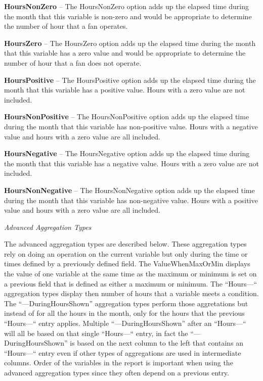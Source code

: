 \textbf{HoursNonZero} -- The HoursNonZero option adds up the elapsed time during the month that this variable is non-zero and would be appropriate to determine the number of hour that a fan operates.

\textbf{HoursZero} -- The HoursZero option adds up the elapsed time during the month that this variable has a zero value and would be appropriate to determine the number of hour that a fan does not operate.

\textbf{HoursPositive} -- The HoursPositive option adds up the elapsed time during the month that this variable has a positive value. Hours with a zero value are not included.

\textbf{HoursNonPositive} -- The HoursNonPositive option adds up the elapsed time during the month that this variable has non-positive value. Hours with a negative value and hours with a zero value are all included.

\textbf{HoursNegative} -- The HoursNegative option adds up the elapsed time during the month that this variable has a negative value. Hours with a zero value are not included.

\textbf{HoursNonNegative} -- The HoursNonNegative option adds up the elapsed time during the month that this variable has non-negative value. Hours with a positive value and hours with a zero value are all included.

\emph{Advanced Aggregation Types}

The advanced aggregation types are described below. These aggregation types rely on doing an operation on the current variable but only during the time or times defined by a previously defined field. The ValueWhenMaxOrMin displays the value of one variable at the same time as the maximum or minimum is set on a previous field that is defined as either a maximum or minimum. The ``Hours---`` aggregation types display then number of hours that a variable meets a condition. The ``---DuringHoursShown'' aggregation types perform those aggretations but instead of for all the hours in the month, only for the hours that the previous ``Hours---`` entry applies. Multiple ``---DuringHoursShown'' after an ``Hours---`` will all be based on that single ``Hours---`` entry, in fact the ``---DuringHoursShown'' is based on the next column to the left that contains an ``Hours---`` entry even if other types of aggregations are used in intermediate columns. Order of the variables in the report is important when using the advanced aggregation types since they often depend on a previous entry.

